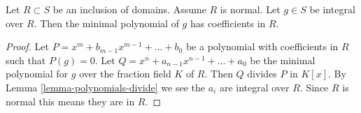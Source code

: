 \begin{lemma}
\label{lemma-minimal-polynomial-normal-domain}
Let $R \subset S$ be an inclusion of domains.
Assume $R$ is normal. Let $g \in S$ be integral
over $R$. Then the minimal polynomial of $g$
has coefficients in $R$.
\end{lemma}

\begin{proof}
Let $P = x^m + b_{m-1} x^{m-1} + \ldots + b_0$
be a polynomial with coefficients in $R$
such that $P(g) = 0$. Let $Q = x^n + a_{n-1}x^{n-1} + \ldots + a_0$
be the minimal polynomial for $g$ over the fraction field
$K$ of $R$. Then $Q$ divides $P$ in $K[x]$. By Lemma
\ref{lemma-polynomials-divide} we see the $a_i$ are
integral over $R$. Since $R$ is normal this
means they are in $R$.
\end{proof}